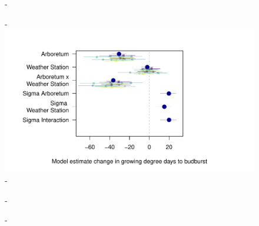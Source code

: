 \documentclass{article}\usepackage[]{graphicx}\usepackage[]{color}
\begin{document}
\begin{figure}
\label{fig:real}
\end{figure}
  
  
{\begin{figure} [H]
  -\begin{center}
  -\includegraphics[width=12cm]{..//analyses/figures/muplot_urban_real.pdf}
  -\caption{}\label{fig:realmu}
  -\end{center}
  -\end{figure}}

  
  
\end{document}
